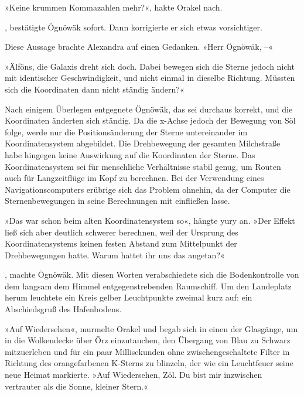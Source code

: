 »Keine krummen Kommazahlen mehr?«, hakte Orakel nach.

, bestätigte Ögnöwäk sofort. Dann korrigierte er sich etwas vorsichtiger. 

Diese Aussage brachte Alexandra auf einen Gedanken. »Herr Ögnöwäk, –«


»Älföns, die Galaxis dreht sich doch. Dabei bewegen sich die Sterne jedoch nicht mit identischer Geschwindigkeit, und nicht einmal in dieselbe Richtung. Müssten sich die Koordinaten dann nicht ständig ändern?«

Nach einigem Überlegen entgegnete Ögnöwäk, das sei durchaus korrekt, und die Koordinaten änderten sich ständig. Da die x-Achse jedoch der Bewegung von Söl folge, werde nur die Positionsänderung der Sterne untereinander im Koordinatensystem abgebildet. Die Drehbewegung der gesamten Milchstraße habe hingegen keine Auswirkung auf die Koordinaten der Sterne. Das Koordinatensystem sei für menschliche Verhältnisse stabil genug, um Routen auch für Langzeitflüge im Kopf zu berechnen. Bei der Verwendung eines Navigationscomputers erübrige sich das Problem ohnehin, da der Computer die Sternenbewegungen in seine Berechnungen mit einfließen lasse.

»Das war schon beim alten Koordinatensystem so«, hängte yury an. »Der Effekt ließ sich aber deutlich schwerer berechnen, weil der Ursprung des Koordinatensystems keinen festen Abstand zum Mittelpunkt der Drehbewegungen hatte. Warum hattet ihr uns das angetan?«

, machte Ögnöwäk.  Mit diesen Worten verabschiedete sich die Bodenkontrolle von dem langsam dem Himmel entgegenstrebenden Raumschiff. Um den Landeplatz herum leuchtete ein Kreis gelber Leuchtpunkte zweimal kurz auf: ein Abschiedsgruß des Hafenbodens.

»Auf Wiedersehen«, murmelte Orakel und begab sich in einen der Glasgänge, um in die Wolkendecke über Örz einzutauchen, den Übergang von Blau zu Schwarz mitzuerleben und für ein paar Millisekunden ohne zwischengeschaltete Filter in Richtung des orangefarbenen K-Sterns zu blinzeln, der wie ein Leuchtfeuer seine neue Heimat markierte. »Auf Wiedersehen, Zöl. Du bist mir inzwischen vertrauter als die Sonne, kleiner Stern.«

